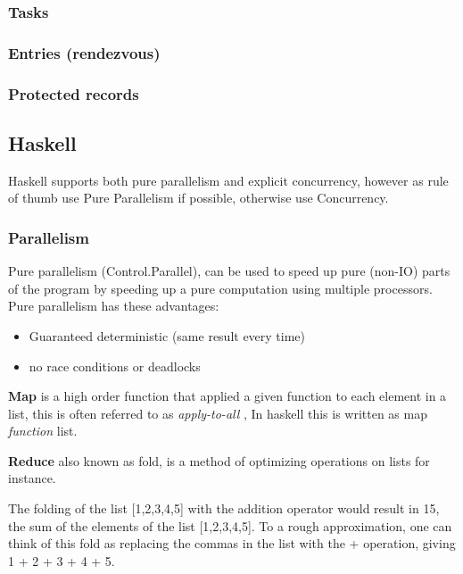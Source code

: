 \documentclass[a4paper,oneside]{report}
\begin{document}
      		\subsubsection{Tasks}
      		\subsubsection{Entries (rendezvous)}
      		\subsubsection{Protected records}
    	\subsection{Haskell}

		Haskell supports both pure parallelism and explicit concurrency, however as rule of thumb use Pure Parallelism if possible, otherwise use Concurrency.

		\subsubsection{Parallelism}

			Pure parallelism (Control.Parallel), can be used to speed up pure (non-IO) parts of the program by speeding up a pure computation using multiple processors. Pure parallelism has these advantages:
				\begin{itemize}
					\item Guaranteed deterministic (same result every time)
					\item no race conditions or deadlocks
				\end{itemize}

			\textbf{Map} is a high order function that applied a given function to each element in a list, this is often referred to as \emph{apply-to-all} , In haskell this is written as map \emph{function} list.



			\textbf{Reduce} also known as fold, is a method of optimizing operations on lists for instance. 

			The folding of the list [1,2,3,4,5] with the addition operator would result in 15, the sum of the elements of the list [1,2,3,4,5]. To a rough approximation, one can think of this fold as replacing the commas in the list with the + operation, giving 1 + 2 + 3 + 4 + 5.
\end{document}
